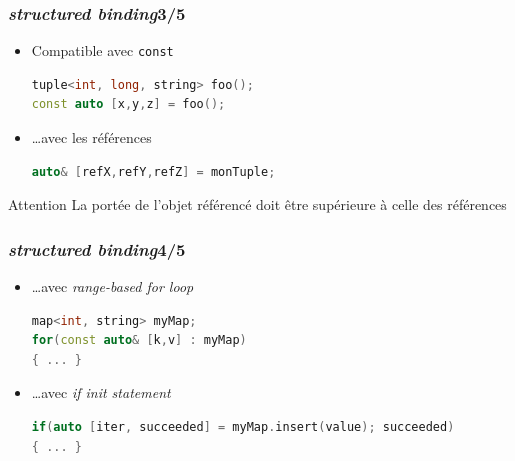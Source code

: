 \documentclass[C++.tex]{subfiles}
\begin{document}
\begin{frame}[fragile]
	\frametitle{\textit{structured binding}\titlehfill{}3/5}
	\begin{itemize}
		\item Compatible avec \lstinline|const|

		\begin{lstlisting}[language=C++]
tuple<int, long, string> foo();
const auto [x,y,z] = foo();\end{lstlisting}

		\item \ldots{}avec les références

		\begin{lstlisting}[language=C++]
auto& [refX,refY,refZ] = monTuple;\end{lstlisting}
	\end{itemize}

	\begin{alertblock}{Attention}
		La portée de l'objet référencé doit être supérieure à celle des références
	\end{alertblock}

\end{frame}

\begin{frame}[fragile]
	\frametitle{\textit{structured binding}\titlehfill{}4/5}
	\begin{itemize}
		\item \ldots{}avec \textit{range-based for loop}

		\begin{lstlisting}[language=C++]
map<int, string> myMap;    
for(const auto& [k,v] : myMap) 
{ ... } \end{lstlisting}

		\item \ldots{}avec \textit{if init statement}

		\begin{lstlisting}[language=C++]
if(auto [iter, succeeded] = myMap.insert(value); succeeded)
{ ... }\end{lstlisting}
	\end{itemize}
\end{frame}
\end{document}
